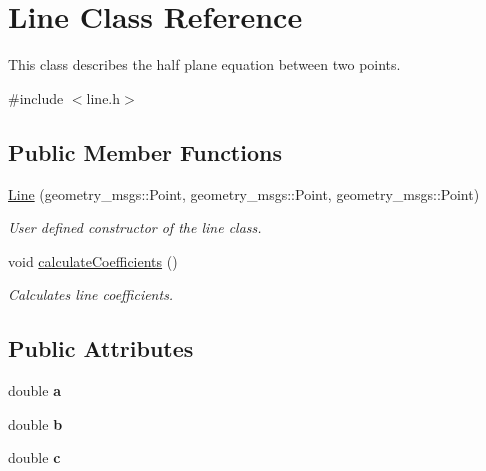 \hypertarget{class_line}{}\section{Line Class Reference}
\label{class_line}


This class describes the half plane equation between two points.  




{\ttfamily \#include $<$line.\+h$>$}

\subsection*{Public Member Functions}
\begin{DoxyCompactItemize}
\item 
\hyperlink{class_line_a289e8402ebf5be14865f91cc684c98dc}{Line} (geometry\+\_\+msgs\+::\+Point, geometry\+\_\+msgs\+::\+Point, geometry\+\_\+msgs\+::\+Point)
\begin{DoxyCompactList}\small\item\em User defined constructor of the line class. \end{DoxyCompactList}\item 
\mbox{\label{class_line_a2984166d7ae6bfe15141a568da773a32}} 
void \hyperlink{class_line_a2984166d7ae6bfe15141a568da773a32}{calculate\+Coefficients} ()
\begin{DoxyCompactList}\small\item\em Calculates line coefficients. \end{DoxyCompactList}\end{DoxyCompactItemize}
\subsection*{Public Attributes}
\begin{DoxyCompactItemize}
\item 
\mbox{\label{class_line_aac9f3d76356545f5ab1cdc3fd52abd22}} 
double {\bfseries a}
\item 
\mbox{\label{class_line_ac6de6683110d1c49d6d995476fdd31ed}} 
double {\bfseries b}
\item 
\mbox{\label{class_line_a98e471f33a380da1baa565813b08dead}} 
double {\bfseries c}
\end{DoxyCompactItemize}


